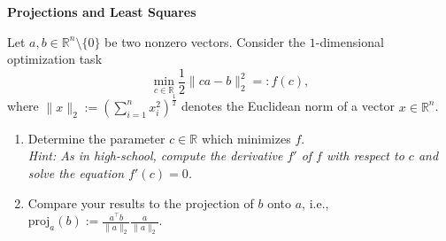 \textbf{Projections and Least Squares}

Let $a,b \in \mathbb{R}^n\setminus \{0\}$ be two nonzero vectors. Consider the $1$-dimensional optimization task
$$\min_{c \in \mathbb{R}} \frac{1}{2} \|ca - b\|_2^2 =: f(c),$$ 
where $\|x\|_2:= \left(\sum_{i=1}^n x_i^2\right)^{\frac{1}{2}}$ denotes the Euclidean norm of a vector $x \in \mathbb{R}^n$.
\begin{enumerate}
	\item Determine the parameter $c\in \mathbb{R}$ which minimizes $f$.\\
	\textit{Hint: As in high-school, compute the derivative $f'$ of $f$ with respect to $c$ and solve the equation $f'(c)=0$.}
	\item  Compare your results to the projection of $b$ onto $a$, i.e., $\text{proj}_a(b):=\frac{a^\top b}{\|a\|_2}\frac{a}{\|a\|_2}$. 
\end{enumerate}
